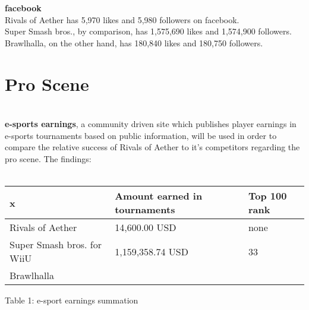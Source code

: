 \documentclass{article}
\begin{document}
\textbf{facebook}\\
Rivals of Aether has 5,970 likes and 5,980 followers on facebook. \cite{fb:11}\\
Super Smash bros., by comparison, has 1,575,690 likes and 1,574,900 followers. \cite{fbs:12}\\
Brawlhalla, on the other hand, has 180,840 likes and 180,750 followers.\cite{fbb:13}\\

\chapter{Pro Scene}\\
\textbf{e-sports earnings}, a community driven site which publishes player earnings in e-sports tournaments based on public information, will be used in order to compare the relative success of Rivals of Aether to it's competitors regarding the pro scene. The findings:\\
\\

\begin{center}
\begin{table}
\begin{tabular}{|l|l|l|}
\hline
x & Amount earned in tournaments & Top 100 rank \\
\hline
Rivals of Aether & 14,600.00 USD & none \\
\hline
Super Smash bros. for WiiU & 1,159,358.74 USD & 33\\
\hline
Brawlhalla & & \\
\hline
\end{tabular}
Table 1: e-sport earnings summation\\
\end{table}

\end{center}

\newpage


\end{document}
